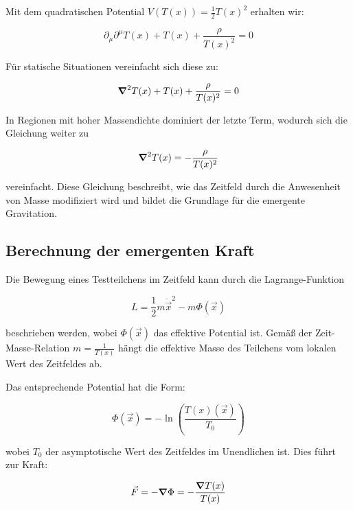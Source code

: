 \documentclass[12pt,a4paper]{article}
\newcommand{\Tfield}{T(x)}
\newcommand{\Tzero}{T_0}
\newcommand{\vecx}{\vec{x}}
\begin{document}
	Mit dem quadratischen Potential \(V(\Tfield) = \frac{1}{2} \Tfield^2\) erhalten wir:
	
	\begin{equation}
		\partial_\mu \partial^\mu \Tfield + \Tfield + \frac{\rho}{\Tfield^2} = 0
	\end{equation}
	
	Für statische Situationen vereinfacht sich diese zu:
	
	\begin{equation}
		\grad^2 \Tfield + \Tfield + \frac{\rho}{\Tfield^2} = 0
	\end{equation}
	
	In Regionen mit hoher Massendichte dominiert der letzte Term, wodurch sich die Gleichung weiter zu
	
	\begin{equation}
		\grad^2 \Tfield = -\frac{\rho}{\Tfield^2}
	\end{equation}
	
	vereinfacht. Diese Gleichung beschreibt, wie das Zeitfeld durch die Anwesenheit von Masse modifiziert wird und bildet die Grundlage für die emergente Gravitation.
	
	\subsection{Berechnung der emergenten Kraft}
	Die Bewegung eines Testteilchens im Zeitfeld kann durch die Lagrange-Funktion
	
	\begin{equation}
		L = \frac{1}{2}m\dot{\vecx}^2 - m\Phi(\vecx)
	\end{equation}
	
	beschrieben werden, wobei \(\Phi(\vecx)\) das effektive Potential ist. Gemäß der Zeit-Masse-Relation \(m = \frac{1}{\Tfield}\) hängt die effektive Masse des Teilchens vom lokalen Wert des Zeitfeldes ab.
	
	Das entsprechende Potential hat die Form:
	
	\begin{equation}
		\Phi(\vecx) = -\ln\left(\frac{\Tfield(\vecx)}{\Tzero}\right)
	\end{equation}
	
	wobei \(\Tzero\) der asymptotische Wert des Zeitfeldes im Unendlichen ist. Dies führt zur Kraft:
	
	\begin{equation}
		\vec{F} = -\grad \Phi = -\frac{\grad \Tfield}{\Tfield}
	\end{equation}
	
\end{document}
